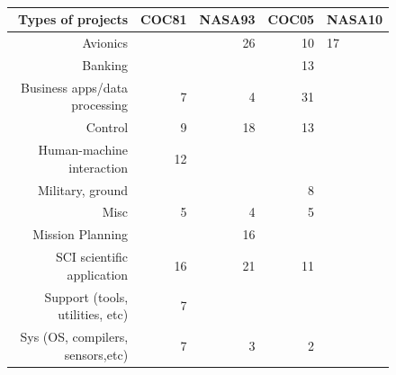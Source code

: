 \documentclass{sig-alternate}
\begin{document}
\begin{figure}[!t]
\begin{center}

~\\~\\~\\

{\scriptsize
\begin{tabular}{r|@{~}r|@{~}r|@{~}r|@{~}l}

Types of projects& COC81 & NASA93& COC05 &NASA10\\\hline\hline
Avionics&     &26&10&17\\\hline
Banking&       &      &13&     \\\hline
Business apps/data processing&7&4&31&  \\\hline   
Control&9&18&13&     \\\hline
Human-machine interaction&12&       &       &     \\\hline
Military, ground&       &       &8&     \\\hline
Misc&5&4&5&     \\\hline
Mission Planning&      &16&       &     \\\hline
SCI scientific application&16&21&11&     \\\hline
Support (tools, utilities, etc)&7&        &       &   \\\hline  
Sys (OS, compilers, sensors,etc)&7&3&2&     


\end{tabular}}


\end{center}
\end{figure}
\end{document}
